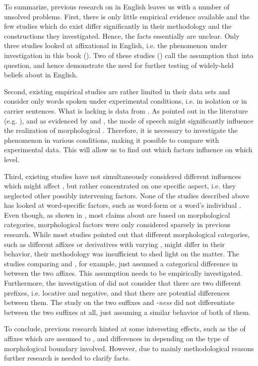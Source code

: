 To summarize, previous research on  in English leaves us with a number of unsolved problems. First, there is only little empirical evidence available and the few studies which do exist differ significantly in their methodology and the constructions they investigated. Hence, the facts essentially are unclear. Only three studies looked at affixational  in English, i.e. the phenomenon under investigation in this book (\citealt{Kaye.2005, Oh.2012, Kotzor.2016}). Two of these studies (\citealt{Kaye.2005, Oh.2012}) call the assumption that   into question, and hence demonstrate the need for further testing of widely-held beliefs about  in English. 

Second, existing empirical studies are rather limited in their data sets and consider only words spoken under experimental conditions, i.e. in isolation or in carrier sentences. What is lacking is data from . As pointed out in the literature (e.g. \citealt{Giegerich.1992, Bauer.2013}), and as evidenced by \cite{Oh.2012} and \cite{Oh.2013}, the mode of speech might significantly influence the realization of morphological . Therefore, it is necessary to investigate the phenomenon in various conditions, making it possible to compare  with experimental data. This will allow us to find out which factors influence  on which level.

Third, existing studies have not simultaneously considered different influences which might affect , but rather concentrated on one specific aspect, i.e. they neglected other possibly intervening factors. None of the studies described above has looked at word-specific factors, such as word-form  or a word's individual . Even though, as shown in , most claims about  are based on morphological categories, morphological factors were only considered sparsely in previous research. While most studies pointed out that different morphological categories, such as different affixes or derivatives with varying , might differ in their  behavior, their methodology was insufficient to shed light on the matter. 
The studies comparing  and , for example, just assumed a categorical difference in  between the two affixes. This assumption needs to be empirically investigated. Furthermore, the investigation of  did not consider that there are two different prefixes, i.e. locative and negative, and that there are potential differences between them. The study on the two suffixes  and \textit{-ness} did not differentiate between the two suffixes at all, just assuming a similar behavior of both of them. 

To conclude, previous research hinted at some interesting effects, such as the  of affixes which are assumed to , and differences in  depending on the type of morphological boundary involved. However, due to mainly methodological reasons further research is needed to clarify facts.

